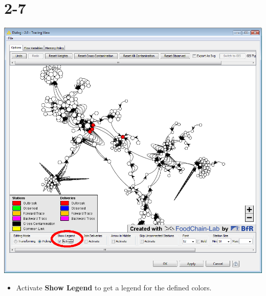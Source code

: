 \documentclass[10pt]{beamer}
\begin{document}
\section{2-7}
\begin{frame}
	\begin{center}
  		\includegraphics[height=0.6\textheight]{2-7.png}
	\end{center}
	\begin{itemize}
		\item Activate \textbf{Show Legend} to get a legend for the defined colors.
	\end{itemize}
\end{frame}
\end{document}
